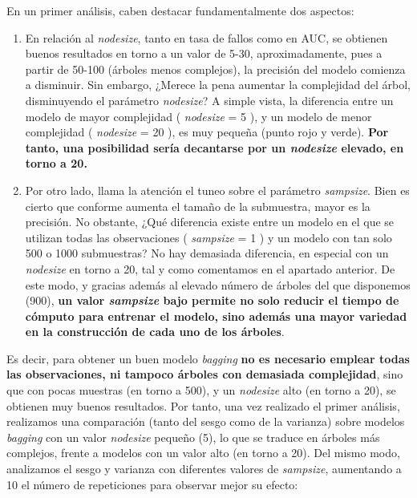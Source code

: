 \documentclass[
]{article}
\begin{document}
En un primer análisis, caben destacar fundamentalmente dos aspectos:

\begin{enumerate}
\def\labelenumi{\arabic{enumi}.}
\item
  En relación al \emph{nodesize}, tanto en tasa de fallos como en AUC,
  se obtienen buenos resultados en torno a un valor de 5-30,
  aproximadamente, pues a partir de 50-100 (árboles menos complejos), la
  precisión del modelo comienza a disminuir. Sin embargo, ¿Merece la
  pena aumentar la complejidad del árbol, disminuyendo el parámetro
  \emph{nodesize}? A simple vista, la diferencia entre un modelo de
  mayor complejidad ( \emph{nodesize} = 5 ), y un modelo de menor
  complejidad ( \emph{nodesize} = 20 ), es muy pequeña (punto rojo y
  verde). \textbf{Por tanto, una posibilidad sería decantarse por un
  \emph{nodesize} elevado, en torno a 20.}
\item
  Por otro lado, llama la atención el tuneo sobre el parámetro
  \emph{sampsize}. Bien es cierto que conforme aumenta el tamaño de la
  submuestra, mayor es la precisión. No obstante, ¿Qué diferencia existe
  entre un modelo en el que se utilizan todas las observaciones (
  \emph{sampsize} = 1 ) y un modelo con tan solo 500 o 1000 submuestras?
  No hay demasiada diferencia, en especial con un \emph{nodesize} en
  torno a 20, tal y como comentamos en el apartado anterior. De este
  modo, y gracias además al elevado número de árboles del que disponemos
  (900), \textbf{un valor \emph{sampsize} bajo permite no solo reducir
  el tiempo de cómputo para entrenar el modelo, sino además una mayor
  variedad en la construcción de cada uno de los árboles}.
\end{enumerate}

Es decir, para obtener un buen modelo \emph{bagging} \textbf{no es
necesario emplear todas las observaciones, ni tampoco árboles con
demasiada complejidad}, sino que con pocas muestras (en torno a 500), y
un \emph{nodesize} alto (en torno a 20), se obtienen muy buenos
resultados. Por tanto, una vez realizado el primer análisis, realizamos
una comparación (tanto del sesgo como de la varianza) sobre modelos
\emph{bagging} con un valor \emph{nodesize} pequeño (5), lo que se
traduce en árboles más complejos, frente a modelos con un valor alto (en
torno a 20). Del mismo modo, analizamos el sesgo y varianza con
diferentes valores de \emph{sampsize}, aumentando a 10 el número de
repeticiones para observar mejor su efecto:
\end{document}
